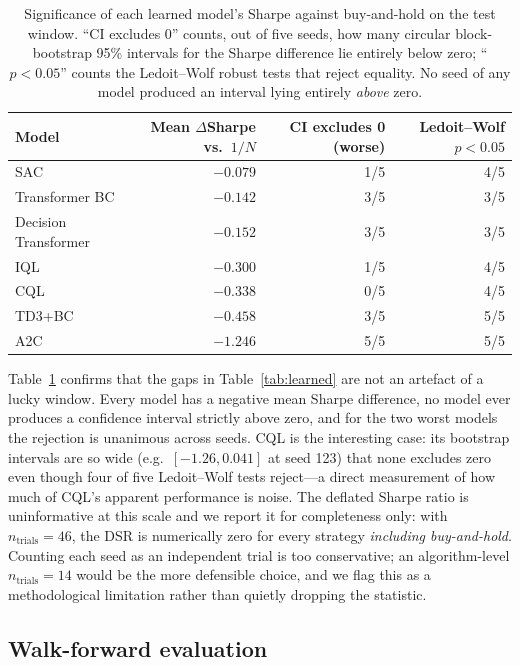 \documentclass[11pt]{article}
\begin{document}
\begin{table}[t]
\centering
\caption{Significance of each learned model's Sharpe against buy-and-hold on the test window.
``CI excludes 0'' counts, out of five seeds, how many circular block-bootstrap 95\% intervals
for the Sharpe difference lie entirely below zero; ``$p<0.05$'' counts the Ledoit--Wolf robust
tests that reject equality. No seed of any model produced an interval lying entirely
\emph{above} zero.}
\label{tab:significance}
\small
\begin{tabular}{lrrr}
\toprule
Model & Mean $\Delta$Sharpe vs.\ $1/N$ & CI excludes 0 (worse) & Ledoit--Wolf $p<0.05$ \\
\midrule
SAC                   & $-0.079$ & 1/5 & 4/5 \\
Transformer BC        & $-0.142$ & 3/5 & 3/5 \\
Decision Transformer  & $-0.152$ & 3/5 & 3/5 \\
IQL                   & $-0.300$ & 1/5 & 4/5 \\
CQL                   & $-0.338$ & 0/5 & 4/5 \\
TD3+BC                & $-0.458$ & 3/5 & 5/5 \\
A2C                   & $-1.246$ & 5/5 & 5/5 \\
\bottomrule
\end{tabular}
\end{table}

Table~\ref{tab:significance} confirms that the gaps in Table~\ref{tab:learned} are not an
artefact of a lucky window. Every model has a negative mean Sharpe difference, no model ever
produces a confidence interval strictly above zero, and for the two worst models the rejection
is unanimous across seeds. CQL is the interesting case: its bootstrap intervals are so wide
(e.g.\ $[-1.26, 0.041]$ at seed 123) that none excludes zero even though four of five
Ledoit--Wolf tests reject---a direct measurement of how much of CQL's apparent performance is
noise. The deflated Sharpe ratio is uninformative at this scale and we report it for
completeness only: with $n_{\text{trials}} = 46$, the DSR is numerically zero for every
strategy \emph{including buy-and-hold}. Counting each seed as an independent trial is too
conservative; an algorithm-level $n_{\text{trials}} = 14$ would be the more defensible choice,
and we flag this as a methodological limitation rather than quietly dropping the statistic.

\subsection{Walk-forward evaluation}
\end{document}
